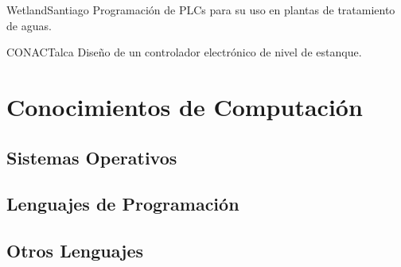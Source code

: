 \documentclass[11pt,letterpaper,sans]{moderncv}
\begin{document}
    \pagebreak[0]

      {Wetland}{Santiago}{}
      {
        Programación de PLCs para su uso en plantas de tratamiento de aguas.
      }

    \pagebreak[0]

      {CONAC}{Talca}{}
      {
        Diseño de un controlador electrónico de nivel de estanque.
      }

\pagebreak[0]

  \section{Conocimientos de Computación}
    \subsection{Sistemas Operativos}
      \begin{cvcolumns}
      \end{cvcolumns}

    \pagebreak[0]

    \subsection{Lenguajes de Programación}
      \begin{cvcolumns}
      \end{cvcolumns}

    \pagebreak[0]

    \subsection{Otros Lenguajes}
      \begin{cvcolumns}
      \end{cvcolumns}
\end{document}
